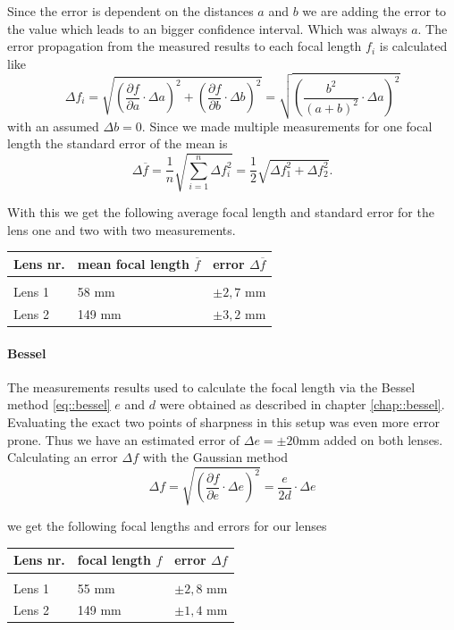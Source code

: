 Since the error is dependent on the distances $a$ and $b$ we are adding the error to the value which leads to an bigger confidence interval.
Which was always $a$.
The error propagation from the measured results to each focal length $f_i$ is calculated like
\[
  \displaystyle	\Delta f_i = \sqrt{\left(\frac{\partial f}{\partial a} \cdot \Delta a \right)^2 +\left(\frac{\partial f}{\partial b} \cdot \Delta b\right)^2 } = \sqrt{\left(\frac{b^2}{(a+b)^2}\cdot \Delta a\right)^2}
\]
with an assumed $\Delta b = 0$. 
Since we made multiple measurements for one focal length the standard error of the mean is
\[
\displaystyle	\Delta \overline{f} =\frac{1}{n} \sqrt{\sum_{i=1}^{n}\Delta f_i^2} = \frac{1}{2}\sqrt{\Delta f_1^2 + \Delta f_2^2 }.
\]

With this we get the following average focal length and standard error for the lens one and two with two measurements.

	\begin{tabularx}{\textwidth}{XM{5cm}M{5cm}}%
		\toprule 
		Lens nr.& mean focal length $\overline{f}$ & error $\Delta \overline{f}$\\
		\hline
		&&\\[-5pt]
		Lens 1	& 58 \si{\milli \m} & $\pm 2,7$ \si{\milli \m}	\\
		Lens 2	& 149 \si{\milli \m} & $\pm 3,2$ \si{\milli \m}	\\
		

		\bottomrule 
	\end{tabularx}

\paragraph{Bessel}
The measurements results used to calculate the focal length via the Bessel method \ref{eq::bessel} $e$ and $d$ were obtained as described in chapter \ref{chap::bessel}.
Evaluating the exact two points of sharpness in this setup was even more error prone.
Thus we have an estimated error of $\Delta e= \pm 20$\si{\milli\m} added on both lenses.
Calculating an error $\Delta f$ with the Gaussian method
\[
\displaystyle	\Delta f = \sqrt{\left(\frac{\partial f}{\partial e} \cdot \Delta e \right)^2 } = \frac{e}{2d}\cdot \Delta e
\]

we get the following focal lengths and errors for our lenses

\begin{tabularx}{\textwidth}{XM{5cm}M{5cm}}%
	\toprule 
	Lens nr.&focal length $f$ & error $\Delta f$\\
	\hline
	&&\\[-5pt]
	Lens 1	& 55 \si{\milli \m} & $\pm 2,8$ \si{\milli \m}	\\
	Lens 2	& 149 \si{\milli \m} & $\pm 1,4$ \si{\milli \m}	\\	
	\bottomrule 
\end{tabularx}

